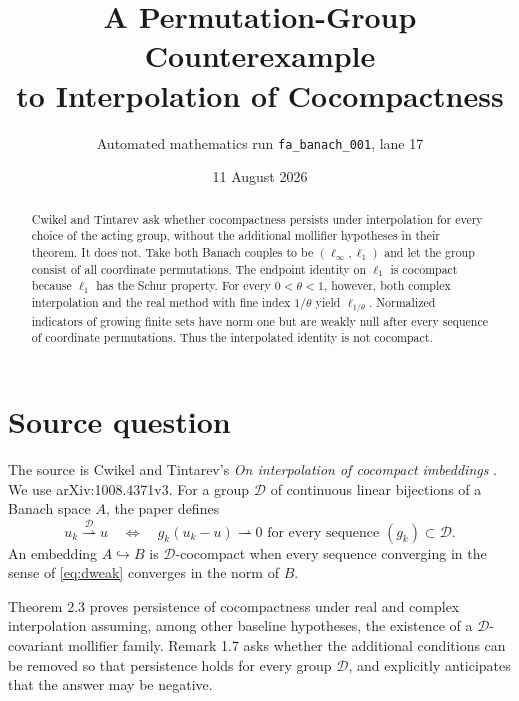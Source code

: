 \documentclass[11pt]{article}
\title{A Permutation-Group Counterexample\\to Interpolation of Cocompactness}
\author{Automated mathematics run \texttt{fa\_banach\_001}, lane 17}
\date{11 August 2026}
\newcommand{\D}{\mathcal D}
\begin{document}
\maketitle

\begin{center}
\end{center}

\begin{abstract}
Cwikel and Tintarev ask whether cocompactness persists under interpolation
for every choice of the acting group, without the additional mollifier
hypotheses in their theorem.  It does not.  Take both Banach couples to be
$(\ell_\infty,\ell_1)$ and let the group consist of all coordinate
permutations.  The endpoint identity on $\ell_1$ is cocompact because
$\ell_1$ has the Schur property.  For every $0<\theta<1$, however, both
complex interpolation and the real method with fine index $1/\theta$ yield
$\ell_{1/\theta}$.  Normalized indicators of growing finite sets have norm
one but are weakly null after every sequence of coordinate permutations.
Thus the interpolated identity is not cocompact.
\end{abstract}

\section{Source question}

The source is Cwikel and Tintarev's \emph{On interpolation of cocompact
imbeddings} \cite{CT}.  We use arXiv:1008.4371v3.  For a group $\D$ of
continuous linear bijections of a Banach space $A$, the paper defines
\[
 u_k\stackrel{\D}{\rightharpoonup}u
 \quad\Longleftrightarrow\quad
 g_k(u_k-u)\rightharpoonup0
 \text{ for every sequence }(g_k)\subset\D.
 \tag{1}\label{eq:dweak}
\]
An embedding $A\hookrightarrow B$ is $\D$-cocompact when every sequence
converging in the sense of \eqref{eq:dweak} converges in the norm of $B$.

Theorem 2.3 proves persistence of cocompactness under real and complex
interpolation assuming, among other baseline hypotheses, the existence of a
$\D$-covariant mollifier family.  Remark 1.7 asks whether the additional
conditions can be removed so that persistence holds for every group $\D$,
and explicitly anticipates that the answer may be negative.
\end{document}
